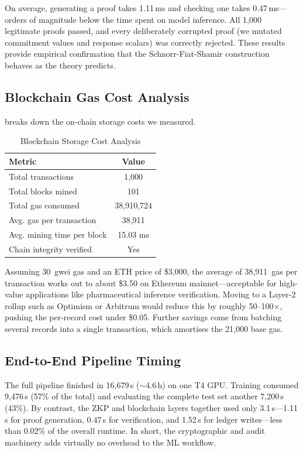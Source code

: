 \documentclass[conference, 10pt]{IEEEtran}
\begin{document}
On average, generating a proof takes 1.11\,ms and checking one takes 0.47\,ms---orders of magnitude below the time spent on model inference. All 1,000 legitimate proofs passed, and every deliberately corrupted proof (we mutated commitment values and response scalars) was correctly rejected. These results provide empirical confirmation that the Schnorr-Fiat-Shamir construction behaves as the theory predicts.

\subsection{Blockchain Gas Cost Analysis}

 breaks down the on-chain storage costs we measured.

\begin{table}[h]
\centering
\caption{Blockchain Storage Cost Analysis}
\label{tab:blockchain}
\begin{tabular}{lc}
\toprule
\textbf{Metric} & \textbf{Value} \\
\midrule
Total transactions & 1,000 \\
Total blocks mined & 101 \\
Total gas consumed & 38,910,724 \\
Avg. gas per transaction & 38,911 \\
Avg. mining time per block & 15.03 ms \\
Chain integrity verified & Yes \\
\bottomrule
\end{tabular}
\end{table}

Assuming 30~gwei gas and an ETH price of \$3{,}000, the average of 38,911~gas per transaction works out to about \$3.50 on Ethereum mainnet---acceptable for high-value applications like pharmaceutical inference verification. Moving to a Layer-2 rollup such as Optimism or Arbitrum would reduce this by roughly 50--100$\times$, pushing the per-record cost under \$0.05. Further savings come from batching several records into a single transaction, which amortises the 21{,}000 base gas.

\subsection{End-to-End Pipeline Timing}

The full pipeline finished in 16,679\,s (${\sim}$4.6\,h) on one T4 GPU. Training consumed 9,476\,s (57\% of the total) and evaluating the complete test set another 7,200\,s (43\%). By contrast, the ZKP and blockchain layers together used only 3.1\,s---1.11\,s for proof generation, 0.47\,s for verification, and 1.52\,s for ledger writes---less than 0.02\% of the overall runtime. In short, the cryptographic and audit machinery adds virtually no overhead to the ML workflow.
\end{document}
